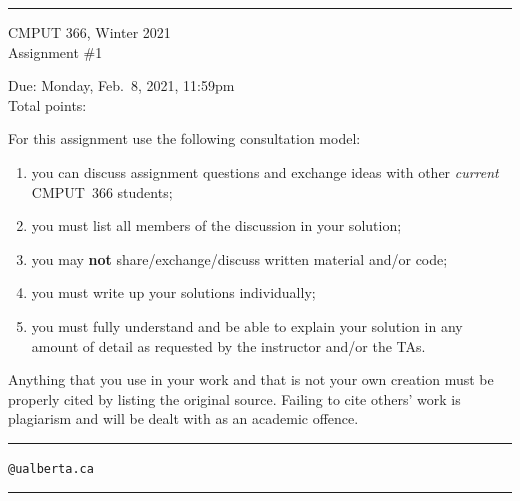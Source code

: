 \documentclass{article}
\newcounter{totalpoints}
\begin{document}
{\bigskip\hrule\bigskip
\huge
\noindent CMPUT 366, Winter 2021\\
Assignment \#1

\large
Due: Monday, Feb.\ 8, 2021, 11:59pm\\
Total points: 

For this assignment use the following consultation model:
\begin{enumerate}

\item you can discuss assignment questions and exchange ideas with other \emph{current} CMPUT~366 students;

\item you must list all members of the discussion in your solution;

\item you may {\bf not} share/exchange/discuss written material and/or code;

\item you must write up your solutions individually;

\item you must fully understand and be able to explain your solution in any amount of detail as requested by the instructor and/or the TAs.

\end{enumerate}

Anything that you use in your work and that is not your own creation must be properly cited by listing the original source. Failing to cite others' work is plagiarism and will be dealt with as an academic offence.


\bigskip\bigskip\hrule\bigskip

\vspace{1cm}
\hspace{1cm}{\bf First name:} \underline{\hspace{7cm}}

\vspace{1cm}
\hspace{1cm}{\bf Last name:} \underline{\hspace{7cm}}

\vspace{1cm}
\hspace{1cm}{\bf CCID:} \underline{\hspace{5.5cm}}\verb|@ualberta.ca|

\vspace{1cm}
\hspace{1cm}{\bf Collaborators:} \underline{\hspace{6.5cm}}

\vspace{1cm}
\bigskip\hrule\bigskip
}
\end{document}
